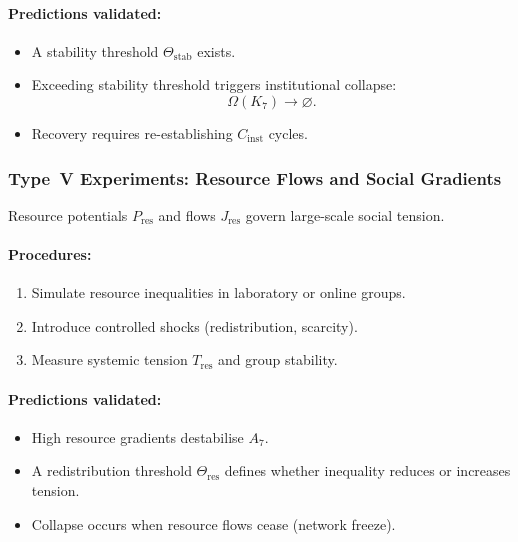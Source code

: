 \paragraph{Predictions validated:}

\begin{itemize}
    \item A stability threshold $\Theta_{\mathrm{stab}}$ exists.
    \item Exceeding stability threshold triggers institutional collapse:
          \[
             \Omega(K_7) \rightarrow \varnothing.
          \]
    \item Recovery requires re-establishing $C_{\mathrm{inst}}$ cycles.
\end{itemize}



\subsubsection{Type~V Experiments: Resource Flows and Social Gradients}

Resource potentials $P_{\mathrm{res}}$ and flows $J_{\mathrm{res}}$
govern large-scale social tension.

\paragraph{Procedures:}

\begin{enumerate}
    \item Simulate resource inequalities in laboratory or online groups.
    \item Introduce controlled shocks (redistribution, scarcity).
    \item Measure systemic tension $T_{\mathrm{res}}$ and group stability.
\end{enumerate}

\paragraph{Predictions validated:}

\begin{itemize}
    \item High resource gradients destabilise $A_7$.
    \item A redistribution threshold $\Theta_{\mathrm{res}}$ defines 
          whether inequality reduces or increases tension.
    \item Collapse occurs when resource flows cease (network freeze).
\end{itemize}



